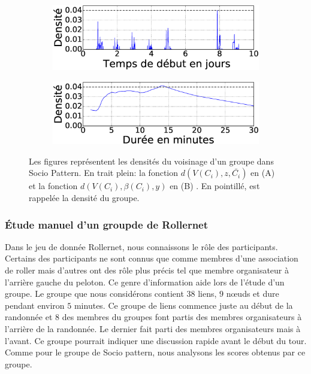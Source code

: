 \begin{figure}
\centering
\begin{subfigure}{0.45\linewidth}
	\includegraphics[width=\linewidth]{img/GroupeDense/GroupExample/SocioPattern/vairable_start9522.eps}
	\caption{}
	\label{fig:g9522_debut}
\end{subfigure}
\begin{subfigure}{0.45\linewidth}
	\includegraphics[width=\linewidth]{img/GroupeDense/GroupExample/SocioPattern/vairable_duration9522}
	\caption{}
	\label{fig:g9522_duree}
\end{subfigure}
\caption{
Les figures représentent les densités du voisinage d'un groupe dans Socio Pattern.
En trait plein: la fonction $d(V(C_i),z,\bar{C_i})$ en (A) et la fonction  $d(V(C_i),\beta(C_i),y)$ en (B) .
En pointillé, est rappelée la densité du groupe.
}
\label{fig:Sp_g9522_exemple}
\end{figure}

\subsubsection{\'Etude manuel d'un groupde de Rollernet}
Dans le jeu de donnée Rollernet, nous connaissons le rôle des participants.
Certains des participants ne sont connus que comme membres d'une association de roller mais d'autres ont des rôle plus précis tel que membre organisateur à l'arrière gauche du peloton.
Ce genre d'information aide lors de l'étude d'un groupe.
Le groupe que nous considérons contient $38$ liens, $9$ n\oe uds et dure pendant environ $5$ minutes.
Ce groupe de liens commence juste au début de la randonnée et $8$ des membres du groupes font partis des membres organisateurs à l'arrière de la randonnée.
Le dernier fait parti des membres organisateurs mais à l'avant.
Ce groupe pourrait indiquer une discussion rapide avant le début du tour.
Comme pour le groupe de Socio pattern, nous analysons les scores obtenus par ce groupe.


